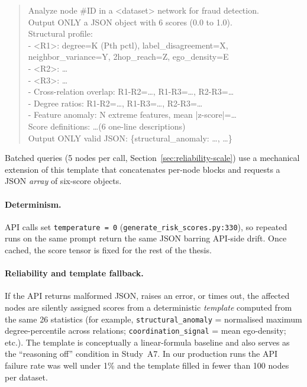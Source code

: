 \begin{quote}\small\ttfamily
Analyze node \#ID in a <dataset> network for fraud detection.\\
Output ONLY a JSON object with 6 scores (0.0 to 1.0).\\[0.2em]
Structural profile:\\
- <R1>: degree=K (Pth pctl), label\_disagreement=X, neighbor\_variance=Y, 2hop\_reach=Z, ego\_density=E\\
- <R2>: \ldots\\
- <R3>: \ldots\\
- Cross-relation overlap: R1-R2=\ldots, R1-R3=\ldots, R2-R3=\ldots\\
- Degree ratios: R1-R2=\ldots, R1-R3=\ldots, R2-R3=\ldots\\
- Feature anomaly: N extreme features, mean |z-score|=\ldots\\[0.2em]
Score definitions: \ldots (6 one-line descriptions)\\
Output ONLY valid JSON: \{structural\_anomaly: \ldots, \ldots\}
\end{quote}

Batched queries (5 nodes per call, Section~\ref{sec:reliability-scale}) use a mechanical extension of this template that concatenates per-node blocks and requests a JSON \emph{array} of six-score objects.

\paragraph{Determinism.} API calls set \texttt{temperature = 0} (\texttt{generate\_risk\_scores.py:330}), so repeated runs on the same prompt return the same JSON barring API-side drift. Once cached, the score tensor is fixed for the rest of the thesis.

\paragraph{Reliability and template fallback.} If the API returns malformed JSON, raises an error, or times out, the affected nodes are silently assigned scores from a deterministic \emph{template} computed from the same 26 statistics (for example, \texttt{structural\_anomaly} = normalised maximum degree-percentile across relations; \texttt{coordination\_signal} = mean ego-density; etc.). The template is conceptually a linear-formula baseline and also serves as the ``reasoning off'' condition in Study~A7. In our production runs the API failure rate was well under 1\% and the template filled in fewer than 100 nodes per dataset.

